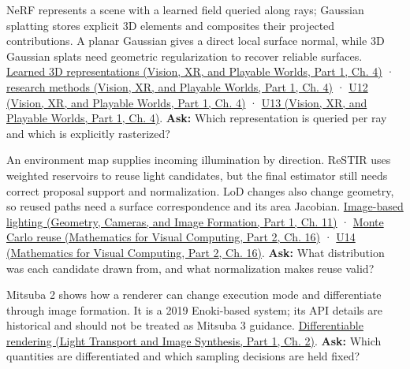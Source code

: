 NeRF represents a scene with a learned field queried along rays; Gaussian splatting stores explicit 3D elements and composites their projected contributions. A planar Gaussian gives a direct local surface normal, while 3D Gaussian splats need geometric regularization to recover reliable surfaces. \href{../07-Vision-XR-and-Playable-Worlds-P01/main.pdf\#04-visual-computing-ii-ch034-learned-representations-of-3d-shape-and-scenes}{Learned 3D representations (Vision, XR, and Playable Worlds, Part 1, Ch. 4)} · \href{../07-Vision-XR-and-Playable-Worlds-P01/main.pdf\#04-visual-computing-ii-ch034-from-scene-representations-to-research-methods}{research methods (Vision, XR, and Playable Worlds, Part 1, Ch. 4)} · \href{../07-Vision-XR-and-Playable-Worlds-P01/main.pdf\#04-visual-computing-ii-ch034-figure-u12---volume-compositing-accumulates-visible-contributions}{U12 (Vision, XR, and Playable Worlds, Part 1, Ch. 4)} · \href{../07-Vision-XR-and-Playable-Worlds-P01/main.pdf\#04-visual-computing-ii-ch034-figure-u13---a-local-gaussian-covariance-projects-to-an-ellipse}{U13 (Vision, XR, and Playable Worlds, Part 1, Ch. 4)}. \textbf{Ask:} Which representation is queried per ray and which is explicitly rasterized?

An environment map supplies incoming illumination by direction. ReSTIR uses weighted reservoirs to reuse light candidates, but the final estimator still needs correct proposal support and normalization. LoD changes also change geometry, so reused paths need a surface correspondence and its area Jacobian. \href{../03-Geometry-Cameras-and-Image-Formation-P01/main.pdf\#03-visual-computing-i-ch004-light-measurement-and-radiometry}{Image-based lighting (Geometry, Cameras, and Image Formation, Part 1, Ch. 11)} · \href{../02-Mathematics-for-Visual-Computing-P02/main.pdf\#03-visual-computing-i-ch012-numerical-integration-and-monte-carlo-estimation}{Monte Carlo reuse (Mathematics for Visual Computing, Part 2, Ch. 16)} · \href{../02-Mathematics-for-Visual-Computing-P02/main.pdf\#03-visual-computing-i-ch012-figure-u14---a-reservoir-selects-a-candidate-by-its-weight}{U14 (Mathematics for Visual Computing, Part 2, Ch. 16)}. \textbf{Ask:} What distribution was each candidate drawn from, and what normalization makes reuse valid?

Mitsuba 2 shows how a renderer can change execution mode and differentiate through image formation. It is a 2019 Enoki-based system; its API details are historical and should not be treated as Mitsuba 3 guidance. \href{../04-Light-Transport-and-Image-Synthesis-P01/main.pdf\#03-visual-computing-i-ch007-the-rendering-equation-and-light-transport}{Differentiable rendering (Light Transport and Image Synthesis, Part 1, Ch. 2)}. \textbf{Ask:} Which quantities are differentiated and which sampling decisions are held fixed?

